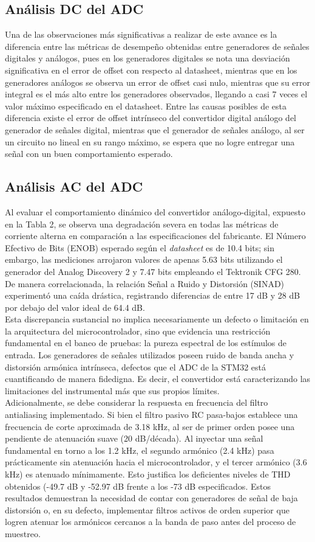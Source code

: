 \documentclass{article}
\begin{document}
\subsection{Análisis DC del ADC}
Una de las observaciones más significativas a realizar de este avance es la diferencia entre las métricas de desempeño obtenidas entre generadores de señales digitales y análogos, pues en los generadores digitales se nota una desviación significativa en el error de offset con respecto al datasheet, mientras que en los generadores análogos se observa un error de offset casi nulo, mientras que su error integral es el más alto entre los generadores observados, llegando a casi 7 veces el valor máximo especificado en el datasheet. Entre las causas posibles de esta diferencia existe el error de offset intrínseco del convertidor digital análogo del generador de señales digital, mientras que el generador de señales análogo, al ser un circuito no lineal en su rango máximo, se espera que no logre entregar una señal con un buen comportamiento esperado.
\subsection{Análisis AC del ADC}
Al evaluar el comportamiento dinámico del convertidor análogo-digital, expuesto en la Tabla 2, se observa una degradación severa en todas las métricas de corriente alterna en comparación a las especificaciones del fabricante. El Número Efectivo de Bits (ENOB) esperado según el \textit{datasheet} es de 10.4 bits; sin embargo, las mediciones arrojaron valores de apenas 5.63 bits utilizando el generador del Analog Discovery 2 y 7.47 bits empleando el Tektronik CFG 280. De manera correlacionada, la relación Señal a Ruido y Distorsión (SINAD) experimentó una caída drástica, registrando diferencias de entre 17 dB y 28 dB por debajo del valor ideal de 64.4 dB.
\\
Esta discrepancia sustancial no implica necesariamente un defecto o limitación en la arquitectura del microcontrolador, sino que evidencia una restricción fundamental en el banco de pruebas: la pureza espectral de los estímulos de entrada. Los generadores de señales utilizados poseen ruido de banda ancha y distorsión armónica intrínseca, defectos que el ADC de la STM32 está cuantificando de manera fidedigna. Es decir, el convertidor está caracterizando las limitaciones del instrumental más que sus propios límites.
\\
Adicionalmente, se debe considerar la respuesta en frecuencia del filtro antialiasing implementado. Si bien el filtro pasivo RC pasa-bajos establece una frecuencia de corte aproximada de 3.18 kHz, al ser de primer orden posee una pendiente de atenuación suave (20 dB/década). Al inyectar una señal fundamental en torno a los 1.2 kHz, el segundo armónico (2.4 kHz) pasa prácticamente sin atenuación hacia el microcontrolador, y el tercer armónico (3.6 kHz) es atenuado mínimamente. Esto justifica los deficientes niveles de THD obtenidos (-49.7 dB y -52.97 dB frente a los -73 dB especificados. Estos resultados demuestran la necesidad de contar con generadores de señal de baja distorsión o, en su defecto, implementar filtros activos de orden superior que logren atenuar los armónicos cercanos a la banda de paso antes del proceso de muestreo.
\end{document}
